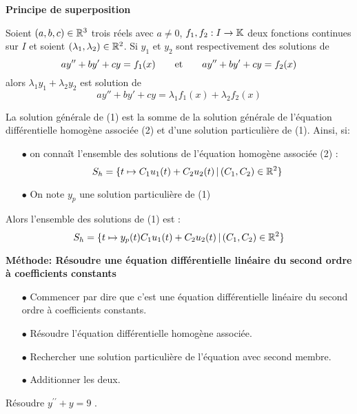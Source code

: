 \documentclass[a4paper, 11pt]{article}
\begin{document}
\textbf{\large{Principe de superposition}}



\begin{prop}
  Soient $(a,b,c)\in\mathbb{R}^3$ trois r\'eels avec $a\not= 0$, $f_1, f_2: I\rightarrow \mathbb{K}$ deux fonctions continues sur $I$ et soient $(\lambda_1,\lambda_2)\in\mathbb{R}^2$. Si $y_1$ et $y_2$ sont respectivement des solutions de
  $$ay^{\prime\prime}+by^{\prime}+cy=f_1(x)\qquad \hbox{et}\qquad ay^{\prime\prime}+by^{\prime}+cy=f_2(x)$$
  alors $\lambda_1y_1+\lambda_2y_2$ est solution de $$ay''+by'+cy = \lambda_1f_1(x)+\lambda_2f_2(x)$$
\end{prop}

%



\begin{theorem}
  La solution g\'en\'erale de (1) est la somme de la solution g\'en\'erale de l'\'equation diff\'erentielle homog\`ene associ\'ee (2) et d'une solution particuli\`ere de (1). Ainsi, si:
  \begin{itemize}
    \item[$\bullet$] on conna\^{i}t l'ensemble des solutions de l'\'equation homog\`ene associ\'ee (2) : $$S_h=\{ t\mapsto C_1u_1(t)+ C_2u_2(t)\, |\,  (C_1,C_2)\in \mathbb{R}^2\}$$
    \item[$\bullet$] On note $y_p$ une solution particuli\`ere de (1)
  \end{itemize}
  \vsec
  Alors l'ensemble des solutions de (1) est : $$S_h=\{ t\mapsto y_p(t)  C_1u_1(t)+ C_2u_2(t)\, |\,  (C_1,C_2)\in \mathbb{R}^2\}$$
\end{theorem}

\begin{minipage}{0.9\textwidth}
  \begin{tcolorbox}[colback=red!5!white,colframe=red!75!black]

    \textbf{M\'ethode: R\'esoudre une \'equation diff\'erentielle lin\'eaire du second ordre \`a coefficients constants}
    \begin{itemize}
      \item[$\bullet$] Commencer par dire que c'est une \'equation diff\'erentielle lin\'eaire du second ordre \`a coefficients constants.
      \item[$\bullet$] R\'esoudre l'\'equation diff\'erentielle homog\`ene associ\'ee.
      \item[$\bullet$] Rechercher une solution particuli\`ere de l'\'equation avec second membre.
      \item[$\bullet$] Additionner les deux.
    \end{itemize}
  \end{tcolorbox}
\end{minipage}
\setlength\fboxrule{0.5pt}
\begin{exercice}
  R\'esoudre $y^{\prime\prime}+y= 9$ .
\end{exercice}
\newpage
\end{document}
